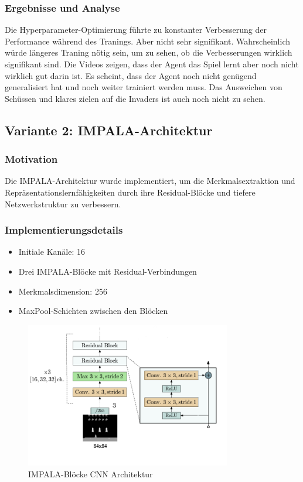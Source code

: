 \documentclass{article}
\begin{document}
\subsubsection{Ergebnisse und Analyse}
Die Hyperparameter-Optimierung führte zu konstanter Verbesserung der Performance während des Tranings. Aber nicht sehr signifikant. Wahrscheinlich würde längeres Traning nötig sein, um zu sehen, ob die Verbesserungen wirklich signifikant sind. Die Videos zeigen, dass der Agent das Spiel lernt aber noch nicht wirklich gut darin ist. Es scheint, dass der Agent noch nicht genügend generalisiert hat und noch weiter trainiert werden muss.
Das Ausweichen von Schüssen und klares zielen auf die Invaders ist auch noch nicht zu sehen.

\subsection{Variante 2: IMPALA-Architektur}
\subsubsection{Motivation}
Die IMPALA-Architektur wurde implementiert, um die Merkmalsextraktion und Repräsentationslernfähigkeiten durch ihre Residual-Blöcke und tiefere Netzwerkstruktur zu verbessern.

\subsubsection{Implementierungsdetails}
\begin{itemize}
    \item Initiale Kanäle: 16
    \item Drei IMPALA-Blöcke mit Residual-Verbindungen
    \item Merkmalsdimension: 256
    \item MaxPool-Schichten zwischen den Blöcken
\end{itemize}

\begin{figure}[H]
    \centering
    \includegraphics[width=0.8\textwidth]{./Figure_2.png}
    \caption{IMPALA-Blöcke CNN Architektur}
\end{figure}
\end{document}
